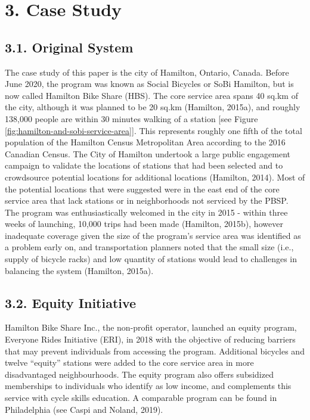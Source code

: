 \documentclass[]{elsarticle} %
\providecommand{\DIFaddtex}[1]{{\protect\color{blue}\uwave{#1}}} %
\providecommand{\DIFaddbegin}{} %
\providecommand{\DIFaddend}{} %
\providecommand{\DIFadd}[1]{\texorpdfstring{\DIFaddtex{#1}}{#1}} %
\newcommand{\DIFaddincludegraphics}[2][]{{\color{blue}\fbox{\DIFOincludegraphics[#1]{#2}}}} %
\DeclareRobustCommand{\DIFaddbegin}{\DIFOaddbegin \let\includegraphics\DIFaddincludegraphics} %
\DeclareRobustCommand{\DIFaddend}{\DIFOaddend \let\includegraphics\DIFOincludegraphics} %
\begin{document}
\hypertarget{sec:study}{%
\section{3. Case Study}\label{sec:study}}

\hypertarget{original-system}{%
\subsection{3.1. Original System}\label{original-system}}

The case study of this paper is the city of Hamilton, Ontario, Canada.
Before June 2020, the program was known as Social Bicycles or SoBi
Hamilton, but is now called Hamilton Bike Share (HBS). The core service
area spans 40 sq.km of the city, although it was planned to be 20 sq.km
(Hamilton, 2015a), and roughly 138,000 people are within 30 minutes
walking of a station {[}see Figure
\ref{fig:hamilton-and-sobi-service-area}{]}. This represents roughly one
fifth of the total population of the Hamilton Census Metropolitan Area
according to the 2016 Canadian Census. The City of Hamilton undertook a
large public engagement campaign to validate the locations of stations
that had been selected and to crowdsource potential locations for
additional locations (Hamilton, 2014). Most of the potential locations
that were suggested were in the east end of the core service area that
lack stations or in neighborhoods not serviced by the PBSP. The program
was enthusiastically welcomed in the city in 2015 - within three weeks
of launching, 10,000 trips had been made (Hamilton, 2015b), however
inadequate coverage given the size of the program's service area was
identified as a problem early on, and transportation planners noted that
the small size (i.e., supply of bicycle racks) and low quantity of
stations would lead to challenges in balancing the system (Hamilton,
2015a).

\hypertarget{equity-initiative}{%
\subsection{3.2. Equity Initiative}\label{equity-initiative}}

Hamilton Bike Share Inc., the non-profit operator, launched an equity
program, Everyone Rides Initiative (ERI), in 2018 with the objective of
reducing barriers that may prevent individuals from accessing the
program. Additional bicycles and twelve ``equity'' stations were added
to the core service area in more disadvantaged \DIFaddbegin \DIFadd{and under-serviced
}\DIFaddend neighbourhoods. The equity program also offers subsidized memberships to
individuals who identify as low income, and complements this service
with cycle skills education. A comparable program can be found in
Philadelphia (see Caspi and Noland, 2019).
\end{document}
